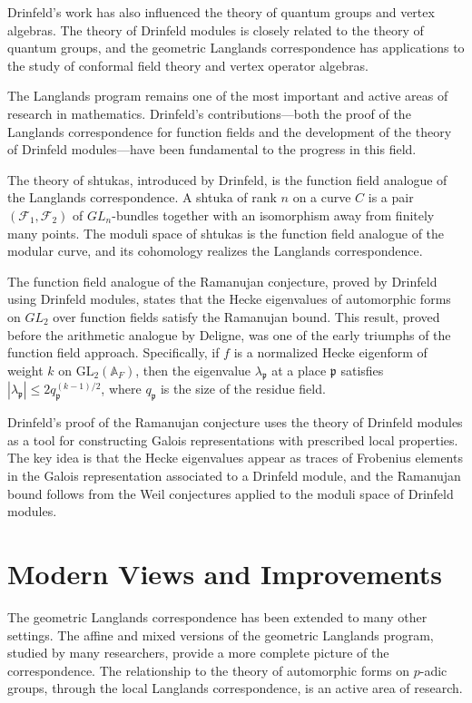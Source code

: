 Drinfeld's work has also influenced the theory of quantum groups and vertex algebras. The theory of Drinfeld modules is closely related to the theory of quantum groups, and the geometric Langlands correspondence has applications to the study of conformal field theory and vertex operator algebras.

The Langlands program remains one of the most important and active areas of research in mathematics. Drinfeld's contributions---both the proof of the Langlands correspondence for function fields and the development of the theory of Drinfeld modules---have been fundamental to the progress in this field.

The theory of shtukas, introduced by Drinfeld, is the function field analogue of the Langlands correspondence. A shtuka of rank $n$ on a curve $C$ is a pair $(\mathcal{F}_1, \mathcal{F}_2)$ of $GL_n$-bundles together with an isomorphism away from finitely many points. The moduli space of shtukas is the function field analogue of the modular curve, and its cohomology realizes the Langlands correspondence.

The function field analogue of the Ramanujan conjecture, proved by Drinfeld using Drinfeld modules, states that the Hecke eigenvalues of automorphic forms on $GL_2$ over function fields satisfy the Ramanujan bound. This result, proved before the arithmetic analogue by Deligne, was one of the early triumphs of the function field approach. Specifically, if $f$ is a normalized Hecke eigenform of weight $k$ on $\text{GL}_2(\mathbb{A}_F)$, then the eigenvalue $\lambda_\mathfrak{p}$ at a place $\mathfrak{p}$ satisfies $|\lambda_\mathfrak{p}| \leq 2q_\mathfrak{p}^{(k-1)/2}$, where $q_\mathfrak{p}$ is the size of the residue field.

Drinfeld's proof of the Ramanujan conjecture uses the theory of Drinfeld modules as a tool for constructing Galois representations with prescribed local properties. The key idea is that the Hecke eigenvalues appear as traces of Frobenius elements in the Galois representation associated to a Drinfeld module, and the Ramanujan bound follows from the Weil conjectures applied to the moduli space of Drinfeld modules.

\section{Modern Views and Improvements}

The geometric Langlands correspondence has been extended to many other settings. The affine and mixed versions of the geometric Langlands program, studied by many researchers, provide a more complete picture of the correspondence. The relationship to the theory of automorphic forms on $p$-adic groups, through the local Langlands correspondence, is an active area of research.

